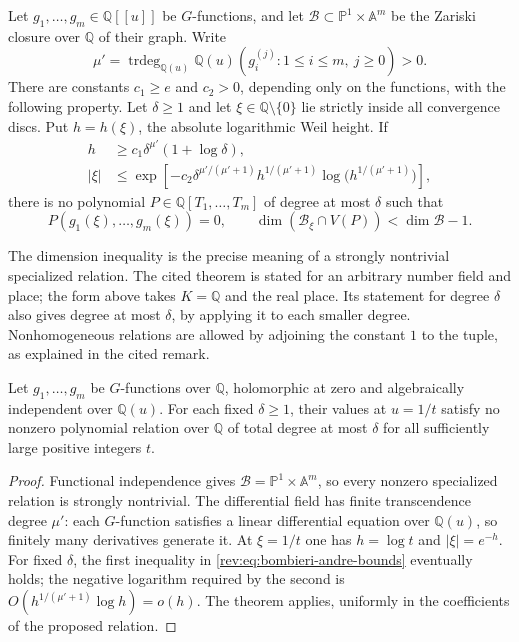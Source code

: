 \begin{theorem}
\label{rev:thm:bombieri-andre}
Let $g_1,\ldots,g_m\in\mathbb Q[[u]]$ be $G$-functions, and let
$\mathcal B\subset\mathbb P^1\times\mathbb A^m$ be the Zariski closure
over $\mathbb Q$ of their graph.  Write
\[
 \mu'=\operatorname{trdeg}_{\mathbb Q(u)}
       \mathbb Q(u)(g_i^{(j)}:1\leq i\leq m,\ j\geq0)>0.
\]
There are constants $c_1\geq e$ and $c_2>0$, depending only on the functions, with
the following property.  Let $\delta\geq1$ and let
$\xi\in\mathbb Q\setminus\{0\}$ lie strictly inside all convergence
discs.  Put $h=h(\xi)$, the absolute logarithmic Weil height.  If
\begin{equation}\label{rev:eq:bombieri-andre-bounds}
 \begin{split}
 h&\geq c_1\delta^{\mu'}(1+\log\delta),\\
 |\xi|&\leq
 \exp\!\left[-c_2\delta^{\mu'/(\mu'+1)}
       h^{1/(\mu'+1)}\log\bigl(h^{1/(\mu'+1)}\bigr)\right],
 \end{split}
\end{equation}
there is no polynomial $P\in\mathbb Q[T_1,\ldots,T_m]$ of degree
at most $\delta$ such that
\[
 P(g_1(\xi),\ldots,g_m(\xi))=0,
 \qquad
 \dim(\mathcal B_\xi\cap V(P))<\dim\mathcal B-1.
\]
\end{theorem}

The dimension inequality is the precise meaning of a strongly
nontrivial specialized relation.  The cited theorem is stated for an
arbitrary number field and place; the form above takes
$K=\mathbb Q$ and the real place.  Its statement for degree $\delta$
also gives degree at most $\delta$, by applying it to each smaller
degree.  Nonhomogeneous relations are allowed by adjoining the
constant $1$ to the tuple, as explained in the cited remark.

\begin{lemma}
\label{lem:C-reciprocal-specialization}
Let $g_1,\ldots,g_m$ be $G$-functions over $\mathbb Q$, holomorphic at
zero and algebraically independent over $\mathbb Q(u)$.  For each
fixed $\delta\geq1$, their values at $u=1/t$ satisfy no nonzero
polynomial relation over $\mathbb Q$ of total degree at most $\delta$
for all sufficiently large positive integers $t$.
\end{lemma}
\begin{proof}
Functional independence gives
$\mathcal B=\mathbb P^1\times\mathbb A^m$, so every nonzero
specialized relation is strongly nontrivial.  The differential field
has finite transcendence degree $\mu'$: each $G$-function satisfies a
linear differential equation over $\mathbb Q(u)$, so finitely many
derivatives generate it.  At $\xi=1/t$ one has $h=\log t$ and
$|\xi|=e^{-h}$.  For fixed $\delta$, the first inequality in
\eqref{rev:eq:bombieri-andre-bounds} eventually holds; the negative
logarithm required by the second is
$O(h^{1/(\mu'+1)}\log h)=o(h)$.  The theorem applies, uniformly in
the coefficients of the proposed relation.
\end{proof}


